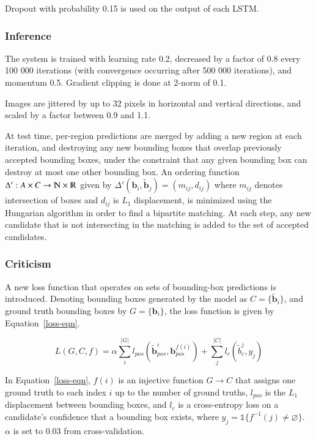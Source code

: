 \documentclass[a4paper, 12pt]{article}
\begin{document}
Dropout with probability 0.15 is used on the output of each LSTM\@.

\subsubsection{Inference}

The system is trained with learning rate 0.2, decreased by a factor of 0.8
every 100 000 iterations (with convergence occurring after 500 000 iterations),
and momentum 0.5. Gradient clipping is done at 2-norm of 0.1.

Images are jittered by up to 32 pixels in horizontal and vertical directions,
and scaled by a factor between 0.9 and 1.1.

At test time, per-region predictions are merged by adding a new region at each
iteration, and destroying any new bounding boxes that overlap previously
accepted bounding boxes, under the constraint that any given bounding box can
destroy at most one other bounding box. An ordering function
$\Delta': A \times C \rightarrow \varmathbb{N} \times \varmathbb{R}$ given by
$\Delta'(\boldsymbol{b}_i, \tilde{\boldsymbol{b}}_j) = (m_{ij}, d_{ij})$ where
$m_{ij}$ denotes intersection of boxes and $d_{ij}$ is $L_1$ displacement, is
minimized using the Hungarian algorithm in order to find a bipartite matching.
At each step, any new candidate that is not intersecting in the matching is
added to the set of accepted candidates.

\subsubsection{Criticism}

A new loss function that operates on sets of bounding-box predictions is
introduced. Denoting bounding boxes generated by the model as
$C = \{\tilde{\boldsymbol{b}}_i\}$, and ground truth bounding boxes by
$G = \{\boldsymbol{b}_i\}$, the loss function is given by
Equation~\ref{loss-eqn}.

\begin{equation}
        L(G, C, f) = \alpha\sum_i^{|G|}
                             l_{pos}\left(\tilde{\boldsymbol{b}}_{pos}^i, \boldsymbol{b}_{pos}^{f(i)}\right) +
                     \sum_j^{|C|} l_c\left(\tilde{b}_c^j, y_j\right)
        \label{loss-eqn}
\end{equation}

In Equation~\ref{loss-eqn}, $f(i)$ is an injective function $G \rightarrow C$
that assigns one ground truth to each index $i$ up to the number of ground
truths, $l_{pos}$ is the $L_1$ displacement between bounding boxes, and $l_c$
is a cross-entropy loss on a candidate's confidence that a bounding box exists,
where $y_j = \mathbb{1}\{f^{-1}(j) \neq \varnothing\}$. $\alpha$ is set to 0.03
from cross-validation.
\end{document}
